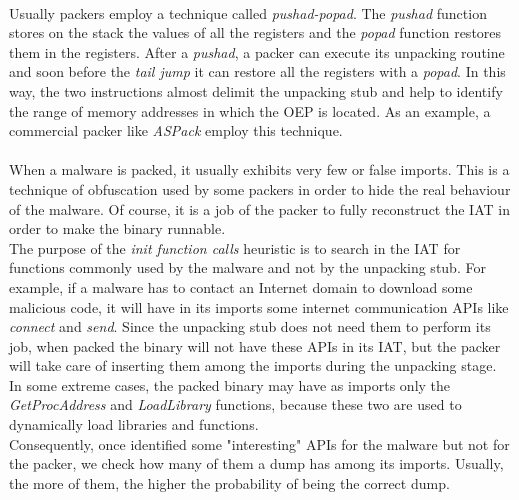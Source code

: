 \paragraph{}
Usually packers employ a technique called \textit{pushad-popad}. The \textit{pushad} function stores on the stack the values of all the registers and the \textit{popad} function restores them in the registers. After a \textit{pushad}, a packer can execute its unpacking routine and soon before the \textit{tail jump} it can restore all the registers with a \textit{popad}. In this way, the two instructions almost delimit the unpacking stub and help to identify the range of memory addresses in which the \ac{OEP} is located. As an example, a commercial packer like \textit{ASPack} employ this technique.
\paragraph{}
When a malware is packed, it usually exhibits very few or false imports. This is a technique of obfuscation used by some packers in order to hide the real behaviour of the malware. Of course, it is a job of the packer to fully reconstruct the \ac{IAT} in order to make the binary runnable.\\
The purpose of the \textit{init function calls} heuristic is to search in the \ac{IAT} for functions commonly used by the malware and not by the unpacking stub. For example, if a malware has to contact an Internet domain to download some malicious code, it will have in its imports some internet communication \acp{API} like \textit{connect} and \textit{send}. Since the unpacking stub does not need them to perform its job, when packed the binary will not have these \acp{API} in its \ac{IAT}, but the packer will take care of inserting them among the imports during the unpacking stage. In some extreme cases, the packed binary may have as imports only the \textit{GetProcAddress} and \textit{LoadLibrary} functions, because these two are used to dynamically load libraries and functions.\\
Consequently, once identified some "interesting" \acp{API} for the malware but not for the packer, we check how many of them a dump has among its imports. Usually, the more of them, the higher the probability of being the correct dump.
\clearpage

